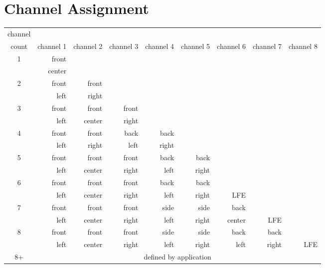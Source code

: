 \section{Channel Assignment}
\begin{table}[h]
{
\begin{tabular}{|c|r|r|r|r|r|r|r|r|}
\hline
channel & & & & & & & & \\
count & channel 1 & channel 2 & channel 3 & channel 4 & channel 5 & channel 6 & channel 7 & channel 8 \\
\hline
\multirow{2}{1em}{1} & front & & & & & & & \\
                     & center & & & & & & & \\
\hline
\multirow{2}{1em}{2} & front & front & & & & & & \\
                     & left  & right & & & & & & \\
\hline
\multirow{2}{1em}{3} & front & front & front & & & & & \\
                     & left  & center & right & & & & & \\
\hline
\multirow{2}{1em}{4} & front & front & back & back & & & & \\
                     & left  & right & left & right & & & & \\
\hline
\multirow{2}{1em}{5} & front & front  & front & back & back & & & \\
                     & left  & center & right & left & right & & & \\
\hline
\multirow{2}{1em}{6} & front & front  & front & back & back & & & \\
                     & left  & center & right & left & right & LFE & & \\
\hline
\multirow{2}{1em}{7} & front & front  & front & side & side  & back   & & \\
                     & left  & center & right & left & right & center & LFE& \\
\hline
\multirow{2}{1em}{8} & front & front  & front & side & side  & back   & back & \\
                     & left  & center & right & left & right & left & right & LFE \\
\hline
8+ & \multicolumn{8}{c|}{defined by application} \\
\hline
\end{tabular}
}
\end{table}
